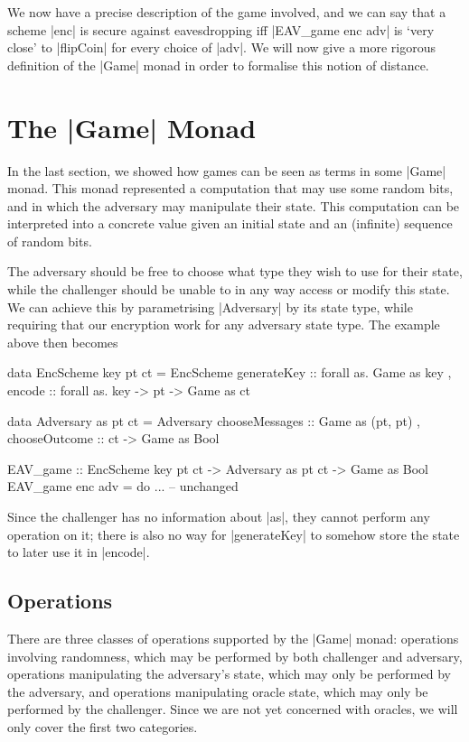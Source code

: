 We now have a precise description of the game involved, and we can say that a scheme |enc| is secure against
eavesdropping iff |EAV_game enc adv| is `very close' to |flipCoin| for every choice of |adv|.  We will now give a more
rigorous definition of the |Game| monad in order to formalise this notion of distance.

\section{The |Game| Monad}

In the last section, we showed how games can be seen as terms in some |Game| monad.  This monad represented a
computation that may use some random bits, and in which the adversary may manipulate their state.  This computation can
be interpreted into a concrete value given an initial state and an (infinite) sequence of random bits.

The adversary should be free to choose what type they wish to use for their state, while the challenger should be unable
to in any way access or modify this state.  We can achieve this by parametrising |Adversary| by its state type, while
requiring that our encryption work for any adversary state type.  The example above then becomes
\begin{code}
data EncScheme key pt ct = EncScheme
                         { generateKey :: forall as. Game as key
                         , encode :: forall as. key -> pt -> Game as ct
                         }

data Adversary as pt ct = Adversary
                        { chooseMessages :: Game as (pt, pt)
                        , chooseOutcome :: ct -> Game as Bool
                        }

EAV_game :: EncScheme key pt ct -> Adversary as pt ct -> Game as Bool
EAV_game enc adv = do
    ... -- unchanged
\end{code}

Since the challenger has no information about |as|, they cannot perform any operation on it; there is also no way for
|generateKey| to somehow store the state to later use it in |encode|.

\subsection{Operations}

There are three classes of operations supported by the |Game| monad: operations involving randomness, which may
be performed by both challenger and adversary, operations manipulating the adversary's state, which may only be
performed by the adversary, and operations manipulating oracle state, which may only be performed by the challenger.
Since we are not yet concerned with oracles, we will only cover the first two categories.

